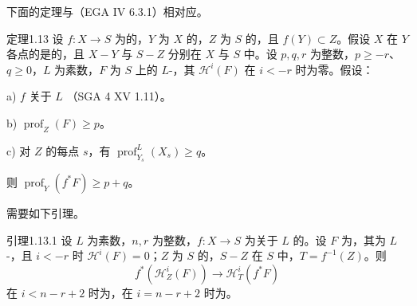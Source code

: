 下面的定理与（EGA IV 6.3.1）相对应。
\begin{SGAresult}{定理}{1.13}
设 $f:X\to S$ 为的，$Y$ 为 $X$ 的，$Z$ 为 $S$ 的，且 $f(Y)\subset Z$。假设 $X$ 在 $Y$ 各点的是的，且 $X-Y$ 与 $S-Z$ 分别在 $X$ 与 $S$ 中。设 $p,q,r$ 为整数，$p\geq-r$、$q\geq0$，$L$ 为素数，$F$ 为 $S$ 上的 $L$-，其 $\mathcal H^i(F)$ 在 $i<-r$ 时为零。假设：

a) $f$ 关于 $L$ （SGA 4 XV 1.11）。

b) $\operatorname{prof}_Z(F)\geq p$。

c) 对 $Z$ 的每点 $s$，有 $\operatorname{prof}_{Y_s}^L(X_s)\geq q$。

则 $\operatorname{prof}_Y(f^*F)\geq p+q$。
\end{SGAresult}
需要如下引理。
\begin{SGAresult}{引理}{1.13.1}
设 $L$ 为素数，$n,r$ 为整数，$f:X\to S$ 为关于 $L$ 的。设 $F$ 为，其为 $L$-，且 $i<-r$ 时 $\mathcal H^i(F)=0$；$Z$ 为 $S$ 的，$S-Z$ 在 $S$ 中，$T=f^{-1}(Z)$。则
\[f^*(\mathcal H_Z^i(F))\longrightarrow\mathcal H_T^i(f^*F)\]
在 $i<n-r+2$ 时为，在 $i=n-r+2$ 时为。
\end{SGAresult}
